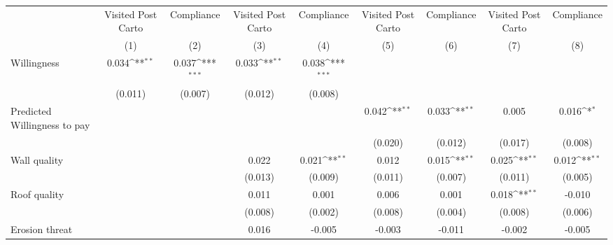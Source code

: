 {
\def\sym#1{\ifmmode^{#1}\else\(^{#1}\)\fi}
\begin{tabular}{l*{8}{c}}
\toprule
                &\multicolumn{1}{c}{Visited Post Carto}&\multicolumn{1}{c}{Compliance}&\multicolumn{1}{c}{Visited Post Carto}&\multicolumn{1}{c}{Compliance}&\multicolumn{1}{c}{Visited Post Carto}&\multicolumn{1}{c}{Compliance}&\multicolumn{1}{c}{Visited Post Carto}&\multicolumn{1}{c}{Compliance}\\
                &\multicolumn{1}{c}{(1)}         &\multicolumn{1}{c}{(2)}         &\multicolumn{1}{c}{(3)}         &\multicolumn{1}{c}{(4)}         &\multicolumn{1}{c}{(5)}         &\multicolumn{1}{c}{(6)}         &\multicolumn{1}{c}{(7)}         &\multicolumn{1}{c}{(8)}         \\
\midrule
Willingness     &    0.034\sym{**} &    0.037\sym{***}&    0.033\sym{**} &    0.038\sym{***}&                  &                  &                  &                  \\
                &  (0.011)         &  (0.007)         &  (0.012)         &  (0.008)         &                  &                  &                  &                  \\
Predicted Willingness to pay&                  &                  &                  &                  &    0.042\sym{**} &    0.033\sym{**} &    0.005         &    0.016\sym{*}  \\
                &                  &                  &                  &                  &  (0.020)         &  (0.012)         &  (0.017)         &  (0.008)         \\
Wall quality    &                  &                  &    0.022         &    0.021\sym{**} &    0.012         &    0.015\sym{**} &    0.025\sym{**} &    0.012\sym{**} \\
                &                  &                  &  (0.013)         &  (0.009)         &  (0.011)         &  (0.007)         &  (0.011)         &  (0.005)         \\
Roof quality    &                  &                  &    0.011         &    0.001         &    0.006         &    0.001         &    0.018\sym{**} &   -0.010         \\
                &                  &                  &  (0.008)         &  (0.002)         &  (0.008)         &  (0.004)         &  (0.008)         &  (0.006)         \\
Erosion threat  &                  &                  &    0.016         &   -0.005         &   -0.003         &   -0.011         &   -0.002         &   -0.005         \\

\end{tabular}}
